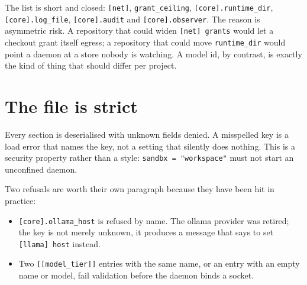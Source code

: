 The list is short and closed: \texttt{[net]}, \texttt{grant\_ceiling},
\texttt{[core].runtime\_dir}, \texttt{[core].log\_file}, \texttt{[core].audit} and
\texttt{[core].observer}. The reason is asymmetric risk. A repository that could widen
\texttt{[net] grants} would let a checkout grant itself egress; a repository that could move
\texttt{runtime\_dir} would point a daemon at a store nobody is watching. A model id, by
contrast, is exactly the kind of thing that should differ per project.

\begin{center}
\begin{minipage}{\linewidth}
\centering
{}
\end{minipage}
\end{center}

\section{The file is strict}

Every section is deserialised with unknown fields denied. A misspelled key is a load error
that names the key, not a setting that silently does nothing. This is a security property
rather than a style: \texttt{sandbx = "workspace"} must not start an unconfined daemon.

Two refusals are worth their own paragraph because they have been hit in practice:

\begin{itemize}
  \item \texttt{[core].ollama\_host} is refused by name. The ollama provider was retired; the
    key is not merely unknown, it produces a message that says to set \texttt{[llama] host}
    instead.
  \item Two \texttt{[[model\_tier]]} entries with the same name, or an entry with an empty
    name or model, fail validation before the daemon binds a socket.
\end{itemize}

